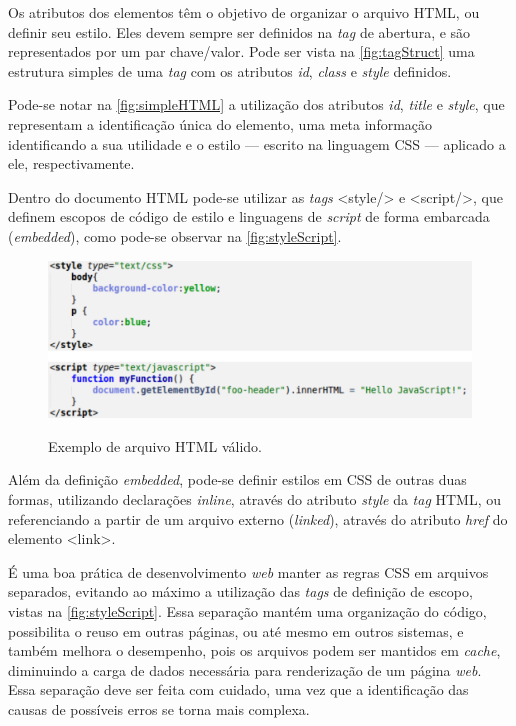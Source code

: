 Os atributos dos elementos têm o objetivo de organizar o arquivo HTML, ou definir seu estilo. Eles devem sempre ser definidos na \textit{tag} de abertura, e são representados por um par chave/valor. Pode ser vista na \autoref{fig:tagStruct} uma estrutura simples de uma \textit{tag} com os atributos \textit{id}, \textit{class} e \textit{style} definidos.

Pode-se notar na \autoref{fig:simpleHTML} a utilização dos atributos \textit{id}, \textit{title} e \textit{style}, que representam a identificação única do elemento, uma meta informação identificando a sua utilidade e o estilo --- escrito na linguagem CSS --- aplicado a ele, respectivamente.

Dentro do documento HTML pode-se utilizar as \textit{tags} <style/> e <script/>, que definem escopos de código de estilo e linguagens de \textit{script} de forma embarcada (\textit{embedded}), como pode-se observar na \autoref{fig:styleScript}.

\begin{figure}[!htb]
	\centering
	\caption{Exemplo de arquivo HTML válido.}
	\includegraphics[width=1\textwidth]{./04-figuras/style_script}
	\label{fig:styleScript}
\end{figure}

Além da definição \textit{embedded}, pode-se definir estilos em CSS de outras duas formas, utilizando declarações \textit{inline}, através do atributo \textit{style} da \textit{tag} HTML, ou referenciando a partir de um arquivo externo (\textit{linked}), através do atributo \textit{href} do elemento <link>. 

É uma boa prática de desenvolvimento \textit{web} manter as regras CSS em arquivos separados, evitando ao máximo a utilização das \textit{tags} de definição de escopo, vistas na \autoref{fig:styleScript}. Essa separação mantém uma organização do código, possibilita o reuso em outras páginas, ou até mesmo em outros sistemas, e também melhora o desempenho, pois os arquivos podem ser mantidos em \textit{cache}, diminuindo a carga de dados necessária para renderização de um página \textit{web}. Essa separação deve ser feita com cuidado, uma vez que a identificação das causas de possíveis erros se torna mais complexa.


